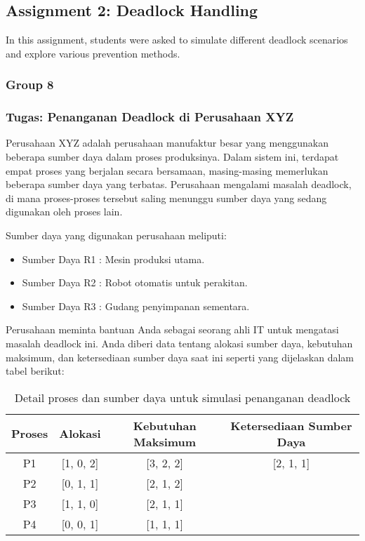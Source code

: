 \documentclass[12pt]{article}
\begin{document}
\subsection{Assignment 2: Deadlock Handling}
In this assignment, students were asked to simulate different deadlock scenarios and explore various prevention methods.
\subsubsection{Group 8}
\subsubsection{Tugas: Penanganan Deadlock di Perusahaan XYZ}
Perusahaan XYZ adalah perusahaan manufaktur besar yang menggunakan beberapa sumber daya dalam proses produksinya. Dalam sistem ini, terdapat empat proses yang berjalan secara bersamaan, masing-masing memerlukan beberapa sumber daya yang terbatas. Perusahaan mengalami masalah deadlock, di mana proses-proses tersebut saling menunggu sumber daya yang sedang digunakan oleh proses lain. 

Sumber daya yang digunakan perusahaan meliputi:
\begin{itemize}
    \item Sumber Daya R1 : Mesin produksi utama.
    \item Sumber Daya R2 : Robot otomatis untuk perakitan.
    \item Sumber Daya R3 : Gudang penyimpanan sementara.
\end{itemize}

Perusahaan meminta bantuan Anda sebagai seorang ahli IT untuk mengatasi masalah deadlock ini. Anda diberi data tentang alokasi sumber daya, kebutuhan maksimum, dan ketersediaan sumber daya saat ini seperti yang dijelaskan dalam tabel berikut:

\begin{table}[htbp]
    \centering
    \begin{tabular}{|c|c|c|c|}
    \hline
    Proses & Alokasi & Kebutuhan Maksimum & Ketersediaan Sumber Daya \\
    \hline
    P1 & [1, 0, 2] & [3, 2, 2] & [2, 1, 1] \\
    \hline
    P2 & [0, 1, 1] & [2, 1, 2] & \\
    \hline
    P3 & [1, 1, 0] & [2, 1, 1] & \\
    \hline
    P4 & [0, 0, 1] & [1, 1, 1] & \\
    \hline
    \end{tabular}
    \caption{Detail proses dan sumber daya untuk simulasi penanganan deadlock}
    \label{tab:comprehensive_deadlock}
\end{table}
\end{document}

